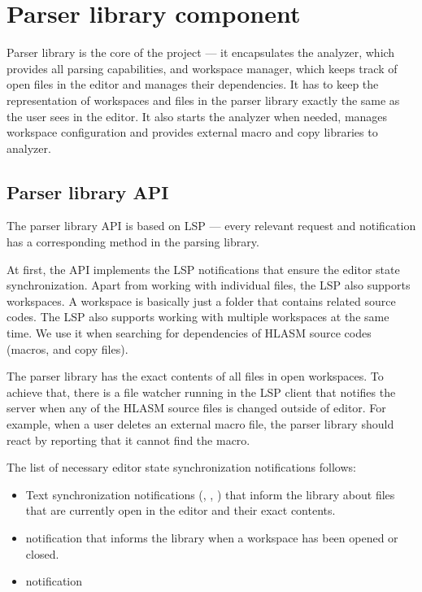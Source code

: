 \section{Parser library component}

Parser library is the core of the project --- it encapsulates the analyzer, which provides all parsing capabilities, and workspace manager, which keeps track of open files in the editor and manages their dependencies. It has to keep the representation of workspaces and files in the parser library exactly the same as the user sees in the editor. It also starts the analyzer when needed, manages workspace configuration and provides external macro and copy libraries to analyzer.

\subsection{Parser library API}
The parser library API is based on LSP --- every relevant request and notification has a corresponding method in the parsing library.

At first, the API implements the LSP notifications that ensure the editor state synchronization. Apart from working with individual files, the LSP also supports workspaces. A workspace is basically just a folder that contains related source codes. The LSP also supports working with multiple workspaces at the same time. We use it when searching for dependencies of HLASM source codes (macros, and copy files).

The parser library has the exact contents of all files in open workspaces. To achieve that, there is a file watcher running in the LSP client that notifies the server when any of the HLASM source files is changed outside of editor. For example, when a user deletes an external macro file, the parser library should react by reporting that it cannot find the macro.

The list of necessary editor state synchronization notifications follows:
\begin{itemize}
	\item Text synchronization notifications (, , ) that inform the library about files that are currently open in the editor and their exact contents.
	\item {} notification that informs the library when a workspace has been opened or closed.
	\item {} notification
\end{itemize}

